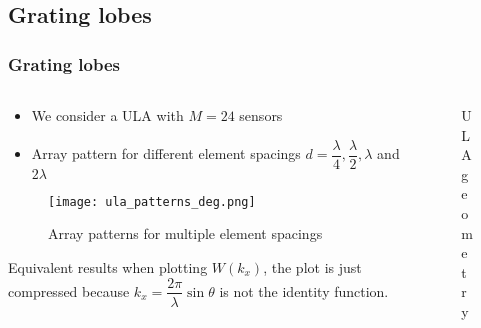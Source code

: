 \documentclass[UKenglish,8pt,aspectratio=1610]{beamer}
\begin{document}
	\subsection{Grating lobes}
	\begin{frame}
	\frametitle{Grating lobes}


\begin{columns}
	\begin{column}{0.6\textwidth}
		\begin{itemize}
		\item We consider a ULA with $M=24$ sensors
		\item Array pattern for different element spacings $d=\dfrac{\lambda}{4},\dfrac{\lambda}{2},\lambda$ and $2\lambda$
	\end{itemize}
		\begin{figure}[h!]
			\texttt{[image: ula\_patterns\_deg.png]}
			\vspace{-5pt}
			\caption{Array patterns for multiple element spacings}
			\centering
		\end{figure}
	\vspace{-10pt}
	Equivalent results when plotting $W(k_x)$, the plot is just compressed because $k_x=\dfrac{2\pi}{\lambda}\sin\theta$ is not the identity function. 
	\end{column}
	\begin{column}{0.35\textwidth}
		\vspace{-30pt}
			\begin{figure}[h!]
			\centering
			\caption{ULA geometry}
		\end{figure}
	

\end{column}
\end{columns}
\end{frame}
\end{document}
